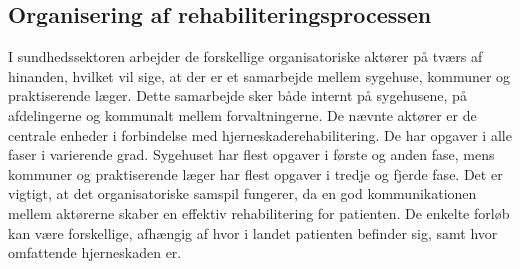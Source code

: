 \subsection{Organisering af rehabiliteringsprocessen}
I sundhedssektoren arbejder de forskellige organisatoriske aktører på tværs af hinanden, hvilket vil sige, at der er et samarbejde mellem sygehuse, kommuner og praktiserende læger. Dette samarbejde sker både internt på sygehusene, på afdelingerne og kommunalt mellem forvaltningerne. \cite{Sundhedsstyrelsen2010}
De nævnte aktører er de centrale enheder i forbindelse med hjerneskaderehabilitering. De har opgaver i alle faser i varierende grad. Sygehuset har flest opgaver i første og anden fase, mens kommuner og praktiserende læger har flest opgaver i tredje og fjerde fase. \cite{Sundhedsstyrelsen2011a}
Det er vigtigt, at det organisatoriske samspil fungerer, da en god kommunikationen mellem aktørerne skaber en effektiv rehabilitering for patienten. De enkelte forløb kan være forskellige, afhængig af hvor i landet patienten befinder sig, samt hvor omfattende hjerneskaden er. \cite{Sundhedsstyrelsen2010}





